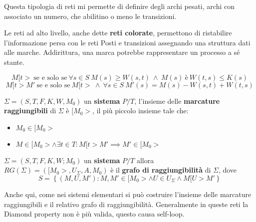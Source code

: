 Questa tipologia di reti mi permette di definire degli archi pesati, archi con
associato un numero, che abilitino o meno le transizioni.

Le reti ad alto livello, anche dette \textbf{reti colorate}, permettono di
ristabilire l'informazione persa con le reti Posti e transizioni assegnando una
struttura dati alle marche. Addirittura, una marca potrebbe rappresentare un
processo a sé stante.
\begin{definizione}
    \begin{equation}
        M[t > \ \text{se e solo se} \ \forall s \in S \ M(s) \geq W(s, t) \ \land
        \ M(s) \ \text{è} \ W(t, s) \leq K(s)
    \end{equation}
    \begin{equation}
        M[t > M' \ \text{se e solo se} \ M[t > \ \land \ \forall s \in S \ M'(s)
        = M(s) - W(s, t) + W(t, s)
    \end{equation}
\end{definizione}
\begin{definizione}
    $\Sigma = (S,T,F,K,W,M_0)$ un \textbf{sistema} $P/T$, l'insieme delle
    \textbf{marcature raggiungibili} di $\Sigma$ è $[M_0>$, il più piccolo
    insieme tale che:
    \begin{itemize}
        \item $M_0\in [M_0>$
        \item $M\in [M_0>\land \exists t\in T: M[t>M'\implies M' \in [M_0>$
    \end{itemize}
\end{definizione}
\begin{definizione}
    $\Sigma = (S,T,F,K,W;M_0)$ un \textbf{sistema} $P/T$ allora
    $RG(\Sigma)=([M_0>,U_\Sigma,A,M_0)$ è il \textbf{grafo di raggiungibilità}
    di $\Sigma$, dove
    \begin{equation}
        S=\left\{(M,U,M'):M,M'\in [M_0>\land U\in U_\Sigma\land M[U>M' \right\}
    \end{equation}
\end{definizione}
Anche qui, come nei sistemi elementari si può costruire l'insieme delle marcature
raggiungibili e il relativo grafo di raggiungibilità. Generalmente in queste reti
la Diamond property non è più valida, questo causa self-loop.

